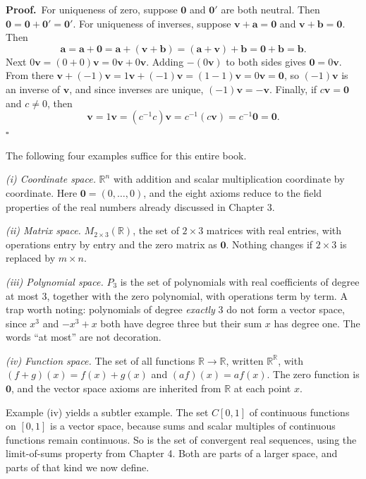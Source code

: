 \par\medskip\noindent\textbf{Proof.}\ 
For uniqueness of zero, suppose $\mathbf{0}$ and $\mathbf{0}'$ are both neutral. Then
$\mathbf{0}=\mathbf{0}+\mathbf{0}'=\mathbf{0}'$. For uniqueness of inverses, suppose
$\mathbf{v}+\mathbf{a}=\mathbf{0}$ and $\mathbf{v}+\mathbf{b}=\mathbf{0}$. Then
\[
  \mathbf{a}=\mathbf{a}+\mathbf{0}=\mathbf{a}+(\mathbf{v}+\mathbf{b})
  =(\mathbf{a}+\mathbf{v})+\mathbf{b}=\mathbf{0}+\mathbf{b}=\mathbf{b}.
\]
Next $0\mathbf{v}=(0+0)\mathbf{v}=0\mathbf{v}+0\mathbf{v}$. Adding $-(0\mathbf{v})$ to both
sides gives $\mathbf{0}=0\mathbf{v}$. From there
$\mathbf{v}+(-1)\mathbf{v}=1\mathbf{v}+(-1)\mathbf{v}=(1-1)\mathbf{v}=0\mathbf{v}=\mathbf{0}$,
so $(-1)\mathbf{v}$ is an inverse of $\mathbf{v}$, and since inverses are unique,
$(-1)\mathbf{v}=-\mathbf{v}$. Finally, if $c\mathbf{v}=\mathbf{0}$ and $c\neq 0$, then
\[
  \mathbf{v}=1\mathbf{v}=(c^{-1}c)\mathbf{v}=c^{-1}(c\mathbf{v})=c^{-1}\mathbf{0}=\mathbf{0}.
\]
\hfill$\square$\par\medskip

The following four examples suffice for this entire book.

\emph{(i) Coordinate space.} $\mathbb{R}^{n}$ with addition and scalar multiplication coordinate
by coordinate. Here $\mathbf{0}=(0,\dots,0)$, and the eight axioms reduce to the field properties
of the real numbers already discussed in Chapter 3.

\emph{(ii) Matrix space.} $M_{2\times3}(\mathbb{R})$, the set of $2\times3$ matrices with real
entries, with operations entry by entry and the zero matrix as $\mathbf{0}$. Nothing changes if
$2\times3$ is replaced by $m\times n$.

\emph{(iii) Polynomial space.} $P_{3}$ is the set of polynomials with real coefficients of degree
at most $3$, together with the zero polynomial, with operations term by term. A trap worth
noting: polynomials of degree \emph{exactly} $3$ do not form a vector space, since $x^{3}$ and
$-x^{3}+x$ both have degree three but their sum $x$ has degree one. The words ``at most'' are not
decoration.

\emph{(iv) Function space.} The set of all functions $\mathbb{R}\to\mathbb{R}$, written
$\mathbb{R}^{\mathbb{R}}$, with $(f+g)(x)=f(x)+g(x)$ and $(af)(x)=af(x)$. The zero function is
$\mathbf{0}$, and the vector space axioms are inherited from $\mathbb{R}$ at each point $x$.

Example (iv) yields a subtler example. The set $C[0,1]$ of continuous functions on $[0,1]$ is a
vector space, because sums and scalar multiples of continuous functions remain continuous. So is
the set of convergent real sequences, using the limit-of-sums property from Chapter 4. Both are
parts of a larger space, and parts of that kind we now define.

